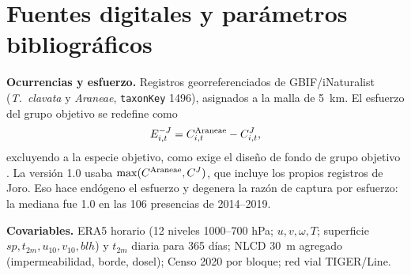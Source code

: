 \documentclass[11pt,letterpaper]{article}
\begin{document}
\section{Fuentes digitales y parámetros bibliográficos}
\label{sec:datos}
\textbf{Ocurrencias y esfuerzo.} Registros georreferenciados de GBIF/iNaturalist (\textit{T.~clavata} y \textit{Araneae}, \texttt{taxonKey} 1496), asignados a la malla de 5~km. El esfuerzo del grupo objetivo se redefine como
\begin{equation}E^{-J}_{i,t}=C^{\rm Araneae}_{i,t}-C^{J}_{i,t},\end{equation}
excluyendo a la especie objetivo, como exige el diseño de fondo de grupo objetivo \cite{phillips2009}. La versión 1.0 usaba $\max(C^{\rm Araneae},C^J)$, que incluye los propios registros de Joro. Eso hace endógeno el esfuerzo y degenera la razón de captura por esfuerzo: la mediana fue 1.0 en las 106 presencias de 2014--2019.

\textbf{Covariables.} ERA5 horario (12 niveles 1000--700 hPa; $u,v,\omega,T$; superficie $sp,t_{2m},u_{10},v_{10},blh$) y $t_{2m}$ diaria para 365 días; NLCD 30~m agregado (impermeabilidad, borde, dosel); Censo 2020 por bloque; red vial TIGER/Line.
\end{document}
